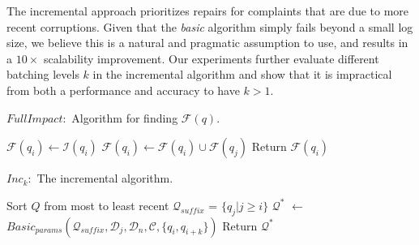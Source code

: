 The incremental approach prioritizes repairs for complaints that are due to more recent corruptions.
Given that the \emph{basic} algorithm simply fails beyond a small log size, we believe this is a natural and pragmatic assumption to use, and results in 
a $10\times$ scalability improvement.
Our experiments further evaluate different batching levels $k$ in the incremental algorithm and show that it is impractical from both a performance and accuracy to have $k > 1$.

\begin{algorithm}[t]
\scriptsize
\caption{$FullImpact:$ Algorithm for finding $\mathcal{F}(q)$.}
\label{alg:fullimpact}
\begin{algorithmic}[2]
\STATE $\mathcal{F}(q_i) \leftarrow \mathcal{I}(q_i)$
\STATE $\mathcal{F}(q_i) \leftarrow \mathcal{F}(q_i) \cup \mathcal{F}(q_j)$
\ENDIF
\ENDFOR
\STATE Return $\mathcal{F}(q_i)$
\end{algorithmic}
\end{algorithm}

\begin{algorithm}[t]
\caption{$Inc_k:$ The incremental algorithm. 
}
\scriptsize
\label{alg:incalg}
\begin{algorithmic}[2]
\STATE Sort $Q$ from most to least recent
  \STATE $\mathcal{Q}_{suffix}$ = $\{q_j | j \ge i \}$ 
  \STATE $\mathcal{Q}^*$ $\leftarrow$ $Basic_{params}(\mathcal{Q}_{suffix}, \mathcal{D}_j, \mathcal{D}_n, \mathcal{C}, \{q_i, q_{i+k}\})$
    \STATE Return $\mathcal{Q}^*$
  \ENDIF
\ENDFOR
\end{algorithmic}
\end{algorithm}




